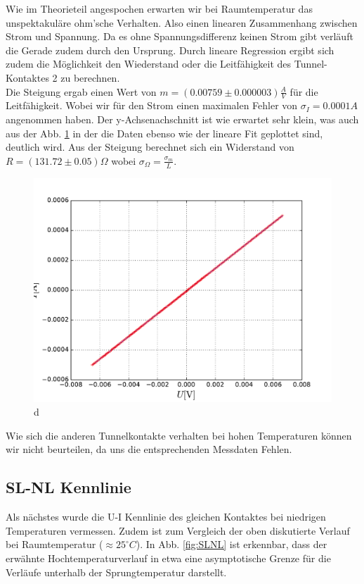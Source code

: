 \documentclass[twoside,        %
               BCOR12mm,       %
               english,ngerman, %
               fleqn,headsepline=false,footsepline=false
              ]{MFPREPORT}
\begin{document}
Wie im Theorieteil angespochen erwarten wir bei Raumtemperatur das unspektakuläre ohm'sche Verhalten. 
Also einen linearen Zusammenhang zwischen Strom und Spannung.
Da es ohne Spannungsdifferenz keinen Strom gibt verläuft die Gerade zudem durch den Ursprung.
Durch lineare Regression ergibt sich zudem die Möglichkeit den Wiederstand oder die Leitfähigkeit des Tunnel-Kontaktes 2 zu berechnen.
\\
Die Steigung ergab einen Wert von $m = (0.00759  \pm 0.000003)  \frac{A}{V}$ für die Leitfähigkeit. Wobei wir für den Strom einen maximalen Fehler von $ \sigma_{I}=0.0001 A$ angenommen haben. 
Der y-Achsenachschnitt ist wie erwartet sehr klein, was auch aus der Abb. \ref{fig:NLNL} in der die Daten ebenso wie der lineare Fit geplottet sind, deutlich wird.
Aus der Steigung berechnet sich ein Widerstand von $R=(131.72 \pm 0.05) \Omega$ wobei $\sigma_{\Omega} = \frac{\sigma_{m}}{L} $.

\begin{figure}[h]
\includegraphics[scale=0.5]{1.pdf}
\caption{d}
\label{fig:NLNL}
\end{figure}

Wie sich die anderen Tunnelkontakte verhalten bei hohen Temperaturen können wir nicht beurteilen, da uns die entsprechenden Messdaten Fehlen.

\subsection{SL-NL Kennlinie}

Als nächstes wurde die U-I Kennlinie des gleichen Kontaktes bei niedrigen Temperaturen vermessen. Zudem ist zum Vergleich der oben diskutierte Verlauf bei Raumtemperatur ($\approx 25^{\circ} C$). In Abb. \ref{fig:SLNL} ist erkennbar, dass der erwähnte Hochtemperaturverlauf in etwa eine asymptotische Grenze für die Verläufe unterhalb der Sprungtemperatur darstellt.
\end{document}
